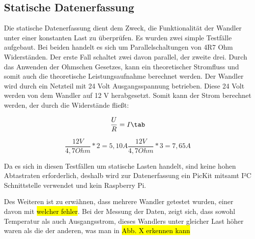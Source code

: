 \subsection{Statische Datenerfassung}
\begin{flushleft}

Die statische Datenerfassung dient dem Zweck, die Funktionalität der Wandler unter einer konstanten Last zu überprüfen. Es wurden zwei simple Testfälle aufgebaut. Bei beiden handelt es sich um Parallelschaltungen von 4R7 Ohm Widerständen. Der erste Fall schaltet zwei davon parallel, der zweite drei. Durch das Anwenden der Ohmschen Gesetzes, kann ein theoretischer Stromfluss und somit auch die theoretische Leistungsaufnahme berechnet werden. Der Wandler wird durch ein Netzteil mit 24 Volt Ausgangsspannung betrieben. Diese 24 Volt werden von dem Wandler auf 12 V herabgesetzt. 
Somit kann der Strom berechnet werden, der durch die Widerstände fließt:

\begin{equation}
\label{Ohmsches Gesetz}
\frac{U}{R} = I \tab
\end{equation}


\begin{equation}
\label{Ohmsches Gesetz}
\frac{12V}{4,7 Ohm}*2 = 5,10 A 
\frac{12V}{4,7 Ohm}*3 = 7,65 A

\end{equation}

Da es sich in diesen Testfällen um statische Lasten handelt, sind keine hohen Abtastraten erforderlich, deshalb wird zur Datenerfassung ein PicKit mitsamt I²C Schnittstelle verwendet und kein Raspberry Pi. 


Des Weiteren ist zu erwähnen, dass mehrere Wandler getestet wurden, einer davon mit \hl{welcher fehler}. Bei der Messung der Daten, zeigt sich, dass sowohl Temperatur als auch Ausgangsstrom, dieses Wandlers unter gleicher Last höher waren als die der anderen, was man in \hl{Abb. X erkennen kann} 

\end{flushleft}

